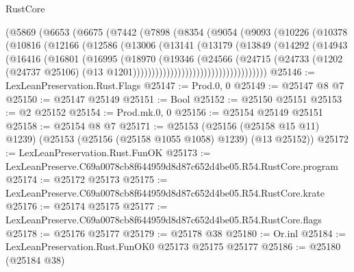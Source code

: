 \begin{lexlean}{RustCore}
\begin{coremodule}
                  (@5869
                    (@6653
                      (@6675
                        (@7442
                          (@7898
                            (@8354
                              (@9054
                                (@9093
                                  (@10226
                                    (@10378
                                      (@10816
                                        (@12166
                                          (@12586
                                            (@13006
                                              (@13141
                                                (@13179
                                                  (@13849
                                                    (@14292
                                                      (@14943
                                                        (@16416
                                                          (@16801
                                                            (@16995
                                                              (@18970
                                                                (@19346
                                                                  (@24566
                                                                    (@24715
                                                                      (@24733
                                                                        (@1202
                                                                          (@24737 @25106)
                                                                          (@13
                                                                            @1201))))))))))))))))))))))))))))))))))))
@25146 := LexLeanPreservation.Rust.Flags
@25147 := Prod.{0, 0}
@25149 := @25147 @8 @7
@25150 := @25147 @25149
@25151 := Bool
@25152 := @25150 @25151
@25153 := @2 @25152
@25154 := Prod.mk.{0, 0}
@25156 := @25154 @25149 @25151
@25158 := @25154 @8 @7
@25171 := @25153
    (@25156 (@25158 @15 @11) @1239)
    (@25153 (@25156 (@25158 @1055 @1058) @1239) (@13 @25152))
@25172 := LexLeanPreservation.Rust.FunOK
@25173 := LexLeanPreserve.C69a0078cb8f644959d8d87c652d4be05.R54.RustCore.program
@25174 := @25172 @25173
@25175 := LexLeanPreserve.C69a0078cb8f644959d8d87c652d4be05.R54.RustCore.krate
@25176 := @25174 @25175
@25177 := LexLeanPreserve.C69a0078cb8f644959d8d87c652d4be05.R54.RustCore.flags
@25178 := @25176 @25177
@25179 := @25178 @38
@25180 := Or.inl
@25184 := LexLeanPreservation.Rust.FunOK0 @25173 @25175 @25177
@25186 := @25180 (@25184 @38)

\end{coremodule}
\end{lexlean}
